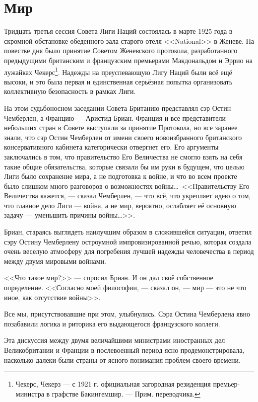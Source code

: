 \chapter{Мир}

Тридцать третья сессия Совета Лиги Наций состоялась в марте 1925 года в скромной обстановке обеденного зала старого отеля <<National>> в Женеве. На повестке дня было принятие Советом Женевского протокола, разработанного предыдущими британским и французским премьерами Макдональдом и Эррио на лужайках Чекерс\footnote{%
Чекерс, Чекерз — с 1921 г. официальная загородная резиденция премьер-министра в графстве Бакингемшир. — Прим. переводчика.}. Надежды на преуспевающую Лигу Наций были всё ещё высоки, и это была первая и единственная серьёзная попытка организовать коллективную безопасность в рамках Лиги.
 
На этом судьбоносном заседании Совета Британию представлял сэр Остин Чемберлен, а Францию — Аристид Бриан. Франция и все представители небольших стран в Совете выступали за принятие Протокола, но все заранее знали, что сэр Остин Чемберлен от имени своего новоизбранного британского консервативного кабинета категорически отвергнет его. Его аргументы заключались в том, что правительство Его Величества не смогло взять на себя такие общие обязательства, которые связали бы им руки в будущем, что целью Лиги было сохранение мира, а не подготовка к войне, и что во всем проекте было слишком много разговоров о возможностях войны\ldots\ <<Правительству Его Величества кажется, — сказал Чемберлен, — что всё, что укрепляет идею о том, что главное дело Лиги — война, а не мир, вероятно, ослабляет её основную задачу — уменьшить причины войны\ldots>>.
 
Бриан, стараясь выглядеть наилучшим образом в сложившейся ситуации, ответил сэру Остину Чемберлену остроумной импровизированной речью, которая создала очень веселую атмосферу для погребения лучшей надежды человечества в период между двумя мировыми войнами.

<<Что такое мир?>> — спросил Бриан. И он дал своё собственное определение. <<Согласно моей философии, — сказал он, — мир — это не что иное, как отсутствие войны>>.

Все мы, присутствовавшие при этом, улыбнулись. Сэра Остина Чемберлена явно позабавили логика и риторика его выдающегося французского коллеги.

Эта дискуссия между двумя величайшими министрами иностранных дел Великобритании и Франции в послевоенный период ясно продемонстрировала, насколько далеки были страны от ясного понимания проблем своего времени.

